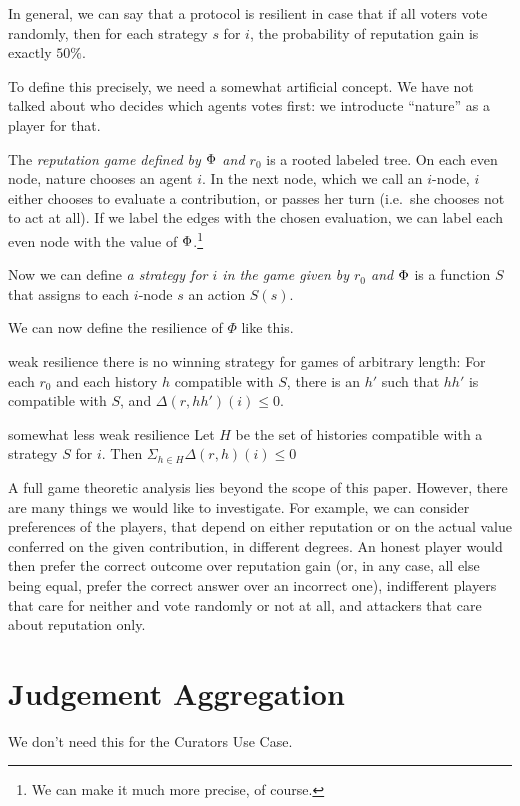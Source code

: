 \documentclass{article}
\begin{document}
In general, we can say that a protocol is resilient in case that if all voters vote randomly, then for each strategy $s$ for $i$, the probability of reputation gain is exactly $50\%$.

To define this precisely, we need a somewhat artificial concept. We have not talked about who decides which agents votes first: we introducte ``nature'' as a player for that.

The {\em reputation game defined by $\Phi$ and $r_0$} is a rooted labeled tree. On each even node, nature chooses an agent $i$. In the next node, which we call an $i$-node, $i$ either chooses to evaluate a contribution, or passes her turn (i.e.\ she chooses not to act at all). 
If we label the edges with the chosen evaluation, we can label each even node with the value of $\Phi$.\footnote{We can make it much more precise, of course.}

Now we can define {\em a strategy for $i$ in the game given by $r_0$ and $\Phi$} is a function $S$ that assigns to each $i$-node $s$ an action $S(s)$.

We can now define the resilience of $\Phi$ like this. 

\begin{condition}{weak resilience} 
there is no winning strategy for games of arbitrary length: For each $r_0$ and each history $h$ compatible with $S$, there is an $h'$ such that $hh'$ is compatible with $S$, and $\Delta(r, hh')(i) \leq 0$.
\end{condition}
\begin{condition}{somewhat less weak resilience} 
Let $H$ be the set of histories compatible with a strategy $S$ for $i$. Then $\Sigma_{h\in H} \Delta(r, h)(i) \leq 0$
\end{condition}
A full game theoretic analysis lies beyond the scope of this paper. However, there are many things we would like to investigate. For example, we can consider preferences of the players, that depend on either reputation or on the actual value conferred on the given contribution, in different degrees. An honest player would then prefer the correct outcome over reputation gain (or, in any case, all else being equal, prefer the correct answer over an incorrect one), indifferent players that care for neither and vote randomly or not at all, and attackers that care about reputation only. 

\section{Judgement Aggregation}
We don't need this for the Curators Use Case.
\end{document}
